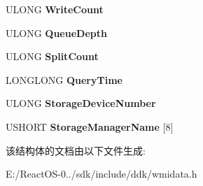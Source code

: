 \begin{DoxyCompactItemize}
U\+L\+O\+NG {\bfseries Write\+Count}
\item 
\mbox{\label{struct___w_m_i___d_i_s_k___p_e_r_f_o_r_m_a_n_c_e_af41fead4baa421693be461563c54cf2a}} 
U\+L\+O\+NG {\bfseries Queue\+Depth}
\item 
\mbox{\label{struct___w_m_i___d_i_s_k___p_e_r_f_o_r_m_a_n_c_e_a9c21c28c7329c345e3a96319e80e7421}} 
U\+L\+O\+NG {\bfseries Split\+Count}
\item 
\mbox{\label{struct___w_m_i___d_i_s_k___p_e_r_f_o_r_m_a_n_c_e_aaf8b8c7c6d19e4d6ade9f7537e36e462}} 
L\+O\+N\+G\+L\+O\+NG {\bfseries Query\+Time}
\item 
\mbox{\label{struct___w_m_i___d_i_s_k___p_e_r_f_o_r_m_a_n_c_e_a96d135de4a4012a04d8d159c3336be92}} 
U\+L\+O\+NG {\bfseries Storage\+Device\+Number}
\item 
\mbox{\label{struct___w_m_i___d_i_s_k___p_e_r_f_o_r_m_a_n_c_e_a4ac8423374ba6420879f2fe6dfb88c93}} 
U\+S\+H\+O\+RT {\bfseries Storage\+Manager\+Name} \mbox{[}8\mbox{]}
\end{DoxyCompactItemize}


该结构体的文档由以下文件生成\+:\begin{DoxyCompactItemize}
\item 
E\+:/\+React\+O\+S-\/0../sdk/include/ddk/wmidata.\+h\end{DoxyCompactItemize}
